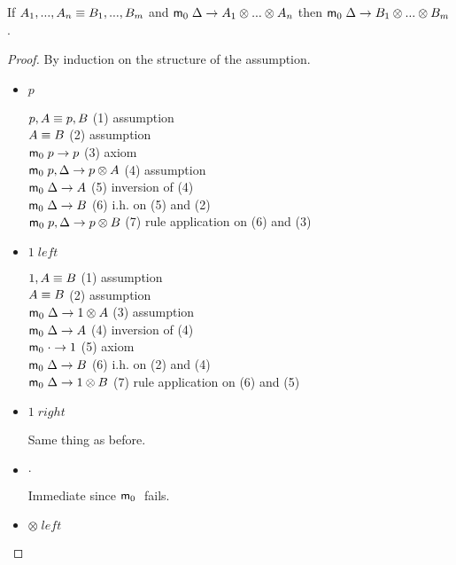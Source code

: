 If $A_1, ..., A_n \equiv B_1, ..., B_m$ and $\mathsf{m}_0 \; \Delta \rightarrow A_1 \otimes ... \otimes A_n$ then $\mathsf{m}_0 \; \Delta \rightarrow B_1 \otimes ... \otimes B_m$.

\begin{proof}
   By induction on the structure of the assumption.
   
   \begin{itemize}
      \item $p$
      
      $p, A \equiv p, B$ \hfill (1) assumption \\
      $A \equiv B$ \hfill (2) assumption \\
      $\mathsf{m}_0 \; p \rightarrow p$ \hfill (3) axiom \\
      $\mathsf{m}_0 \; p, \Delta \rightarrow p \otimes A$ \hfill (4) assumption \\
      $\mathsf{m}_0 \; \Delta \rightarrow A$ \hfill (5) inversion of (4) \\
      $\mathsf{m}_0 \; \Delta \rightarrow B$ \hfill (6) i.h. on (5) and (2) \\
      $\mathsf{m}_0 \; p, \Delta \rightarrow p \otimes B$ \hfill (7) rule application on (6) and (3) \\
      
      \item $1 \; left$
      
      $1, A \equiv B$ \hfill (1) assumption \\
      $A \equiv B$ \hfill (2) assumption \\
      $\mathsf{m}_0 \; \Delta \rightarrow 1 \otimes A$ \hfill (3) assumption \\
      $\mathsf{m}_0 \; \Delta \rightarrow A$ \hfill (4) inversion of (4) \\
      $\mathsf{m}_0 \; \cdot \rightarrow 1$ \hfill (5) axiom \\
      $\mathsf{m}_0 \; \Delta \rightarrow B$ \hfill (6) i.h. on (2) and (4) \\
      $\mathsf{m}_0 \; \Delta \rightarrow 1 \otimes B$ \hfill (7) rule application on (6) and (5) \\
      
      \item $1 \; right$
      
      Same thing as before.
      
      \item $\cdot$
      
      Immediate since $\mathsf{m}_0 \;$ fails.
      
      \item $\otimes \; left$
      

\end{itemize}
\end{proof}

